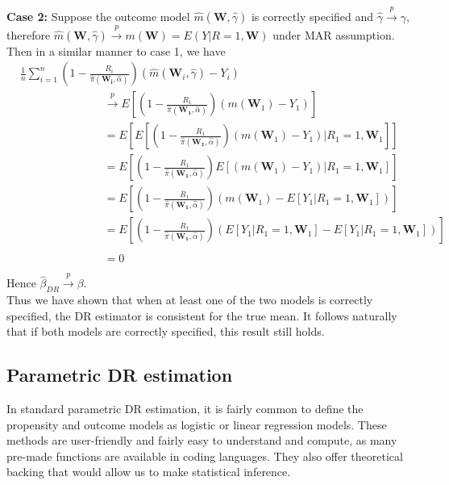 \documentclass[12pt,twoside]{article}
\begin{document}
\textbf{Case 2:} Suppose the outcome model $\hat m(\mathbf{W}, \hat\gamma)$ is correctly specified and $\hat{\gamma} \xrightarrow{p} \gamma$, therefore  $\hat m(\mathbf{W}, \hat\gamma) \xrightarrow{p} m(\mathbf{W}) = E(Y|R = 1,\mathbf{W})$ under MAR assumption. Then in a similar manner to case 1, we have
\begin{align*}
& \frac{1}{n}\sum_{i=1}^{n}\left(1 - \frac{R_i}{\hat\pi(\mathbf{W_i},\hat{\alpha})} \right) (\hat m(\mathbf{W}_i, \hat\gamma)-Y_i) \\
     & \phantom{E [(1 - \frac{R_1}{\pi(\mathbf{W_1})})} \xrightarrow{p} E\left[\left(1 - \frac{R_1}{\hat\pi(\mathbf{W_1},\hat{\alpha})} \right) (m(\mathbf{W}_1)-Y_1)\right]  \\
     & \phantom{E [(1 - \frac{R_1}{\pi(\mathbf{W_1})})} = E\left[ E\left[\left(1 - \frac{R_1}{\hat\pi(\mathbf{W_1},\hat{\alpha})} \right)(m(\mathbf{W}_1)-Y_1)|R_1 = 1, \mathbf{W}_1\right]\right] \\
     & \phantom{E [(1 - \frac{R_1}{\pi(\mathbf{W_1})})} = E\left[\left(1 - \frac{R_1}{\hat\pi(\mathbf{W_1},\hat{\alpha})} \right) E\left[(m(\mathbf{W}_1)-Y_1)|R_1 = 1, \mathbf{W}_1\right]\right] \\
     & \phantom{E [(1 - \frac{R_1}{\pi(\mathbf{W_1})})} = E\left[\left(1 - \frac{R_1}{\hat\pi(\mathbf{W_1},\hat{\alpha})} \right) (m(\mathbf{W}_1)-E\left[Y_1|R_1 = 1, \mathbf{W}_1\right])\right] \\
     & \phantom{E [(1 - \frac{R_1}{\pi(\mathbf{W_1})})} = E\left[\left(1 - \frac{R_1}{\hat\pi(\mathbf{W_1},\hat{\alpha})} \right) (E\left[Y_1|R_1=1, \mathbf{W}_1\right]-E\left[Y_1|R_1=1, \mathbf{W}_1\right])\right] \\
     & \phantom{E [(1 - \frac{R_1}{\pi(\mathbf{W_1})})} = 0
\end{align*}
Hence $\hat{\beta}_{DR} \xrightarrow{p} \beta$.\\

Thus we have shown that when at least one of the two models is correctly specified, the DR estimator is consistent for the true mean. It follows naturally that if both models are correctly specified, this result still holds.

\subsection{Parametric DR estimation}

In standard parametric DR estimation, it is fairly common to define the propensity and outcome models as logistic or linear regression models. These methods are user-friendly and fairly easy to understand and compute, as many pre-made functions are available in coding languages. They also offer theoretical backing that would allow us to make statistical inference.\\
\end{document}
